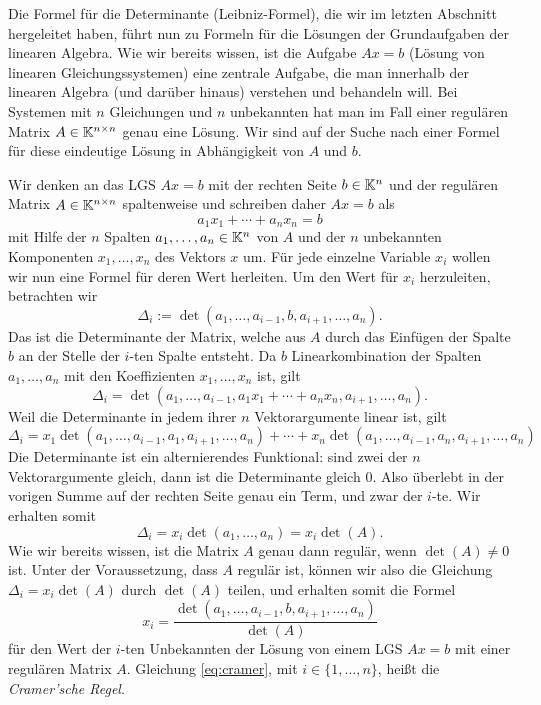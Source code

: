 Die Formel für die Determinante (Leibniz-Formel), die wir im letzten Abschnitt hergeleitet haben, führt nun zu Formeln für die Lösungen der Grundaufgaben der linearen Algebra. Wie wir bereits wissen, ist die Aufgabe $A x = b$ (Lösung von linearen Gleichungssystemen) eine zentrale Aufgabe, die man innerhalb der linearen Algebra (und darüber hinaus) verstehen und behandeln will. Bei Systemen mit $n$ Gleichungen und $n$ unbekannten hat man im Fall einer regulären Matrix $A \in \mathbb K^{n \times n}$ genau eine Lösung. Wir sind auf der Suche nach einer Formel für diese eindeutige Lösung in Abhängigkeit von $A$ und $b$. 

Wir denken an das LGS $A x = b$ mit der rechten Seite $b \in \mathbb K^n$ und der regulären Matrix $A \in \mathbb K^{n \times n}$ spaltenweise und schreiben daher $A x =b$ als 
\[
	a_1 x_1 + \cdots + a_n x_n = b
\]
mit Hilfe der $n$ Spalten $a_1,\ldots,a_n \in \mathbb K^n$ von $A$ und der $n$ unbekannten Komponenten $x_1,\ldots,x_n$ des Vektors $x$ um. Für jede einzelne Variable $x_i$ wollen wir nun eine Formel für deren Wert herleiten. Um den Wert für $x_i$ herzuleiten, betrachten wir 
\[
	\Delta_i := \det(a_1,\ldots,a_{i-1},b,a_{i+1},\ldots,a_n).
\]
Das ist die Determinante der Matrix, welche aus $A$ durch das Einfügen der Spalte $b$ an der Stelle der $i$-ten Spalte entsteht. Da $b$ Linearkombination der Spalten $a_1,\ldots,a_n$ mit den Koeffizienten $x_1,\ldots,x_n$ ist, gilt 
\[
	\Delta_i = \det(a_1,\ldots,a_{i-1}, a_1 x_1 + \cdots + a_n x_n, a_{i+1},\ldots,a_n).
\]
Weil die Determinante in jedem ihrer $n$ Vektorargumente linear ist, gilt 
\[
	\Delta_i = x_1 \det(a_1,\ldots,a_{i-1}, a_1 , a_{i+1},\ldots,a_n) + \cdots + x_n \det(a_1,\ldots,a_{i-1}, a_n , a_{i+1},\ldots,a_n)
\]
Die Determinante ist ein alternierendes Funktional: sind zwei der $n$ Vektorargumente gleich, dann ist die Determinante gleich $0$. Also überlebt in der vorigen Summe auf der rechten Seite genau ein Term, und zwar der $i$-te. Wir erhalten somit
\[
	\Delta_i = x_i \det(a_1,\ldots,a_n) = x_i \det(A). 
\]
Wie wir bereits wissen, ist die Matrix $A$ genau dann regulär, wenn $\det(A) \ne 0$ ist. Unter der Voraussetzung, dass $A$ regulär ist, können wir also die Gleichung $\Delta_i = x_i \det(A)$ durch $\det(A)$ teilen, und erhalten somit die Formel
\begin{equation}\label{eq:cramer}
	x_i = \frac{\det(a_1,\ldots,a_{i-1},b,a_{i+1},\ldots,a_n)}{\det(A)}
\end{equation}
für den Wert der  $i$-ten Unbekannten der Lösung von einem LGS $Ax =b$ mit einer regulären Matrix $A$. Gleichung \eqref{eq:cramer}, mit $i \in \{1,\ldots,n\}$, heißt die \emph{Cramer'sche Regel}. 

